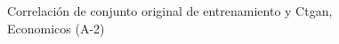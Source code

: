 \begin{figure}[H]
    \centering
    
    \caption{Correlación de conjunto original de entrenamiento y Ctgan, Economicos (A-2)}
    \label{pairwise-economicos-a-2-ctgan}
\end{figure}